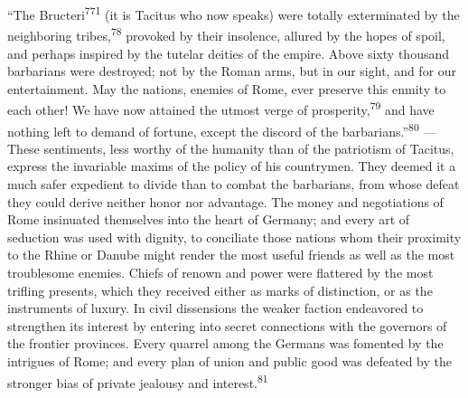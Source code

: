 “The Bructeri\textsuperscript{771} (it is Tacitus who now speaks) were totally
exterminated by the neighboring tribes,\textsuperscript{78} provoked by their
insolence, allured by the hopes of spoil, and perhaps inspired by
the tutelar deities of the empire. Above sixty thousand
barbarians were destroyed; not by the Roman arms, but in our
sight, and for our entertainment. May the nations, enemies of
Rome, ever preserve this enmity to each other! We have now
attained the utmost verge of prosperity,\textsuperscript{79} and have nothing left
to demand of fortune, except the discord of the barbarians.”\textsuperscript{80}
—These sentiments, less worthy of the humanity than of the
patriotism of Tacitus, express the invariable maxims of the
policy of his countrymen. They deemed it a much safer expedient
to divide than to combat the barbarians, from whose defeat they
could derive neither honor nor advantage. The money and
negotiations of Rome insinuated themselves into the heart of
Germany; and every art of seduction was used with dignity, to
conciliate those nations whom their proximity to the Rhine or
Danube might render the most useful friends as well as the most
troublesome enemies. Chiefs of renown and power were flattered by
the most trifling presents, which they received either as marks
of distinction, or as the instruments of luxury. In civil
dissensions the weaker faction endeavored to strengthen its
interest by entering into secret connections with the governors
of the frontier provinces. Every quarrel among the Germans was
fomented by the intrigues of Rome; and every plan of union and
public good was defeated by the stronger bias of private jealousy
and interest.\textsuperscript{81}





